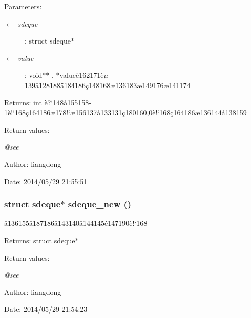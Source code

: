 \begin{Desc}
\item[Parameters:]
\begin{description}
\item[\mbox{$\leftarrow$} {\em sdeque}]: struct sdeque$\ast$ \item[\mbox{$\leftarrow$} {\em value}]: void$\ast$$\ast$ , $\ast$value\`{e}162171\`{e}$\mu$139\aa{}128188\"{a}184186\c{c}148168\ae{}136183\ae{}149176\ae{}141174 \end{description}
\end{Desc}
\begin{Desc}
\item[Returns:]int \`{e}?`148\aa{}155158-1\`{e}!`168\c{c}164186\ae{}178!`\ae{}156137\aa{}133131\c{c}180160,0\`{e}!`168\c{c}164186\ae{}136144\aa{}138159 \end{Desc}
\begin{Desc}
\item[Return values:]
\begin{description}
\item[{\em @see}]\end{description}
\end{Desc}
\begin{Desc}
\item[Author:]liangdong \end{Desc}
\begin{Desc}
\item[Date:]2014/05/29 21:55:51 \end{Desc}
\subsubsection{\setlength{\rightskip}{0pt plus 5cm}struct sdeque$\ast$ sdeque\_\-new ()}\label{sdeque_8h_a0}


\aa{}136155\aa{}187186\aa{}143140\aa{}144145\'{e}147190\`{e}!`168 

\begin{Desc}
\item[Returns:]struct sdeque$\ast$ \end{Desc}
\begin{Desc}
\item[Return values:]
\begin{description}
\item[{\em @see}]\end{description}
\end{Desc}
\begin{Desc}
\item[Author:]liangdong \end{Desc}
\begin{Desc}
\item[Date:]2014/05/29 21:54:23 \end{Desc}
